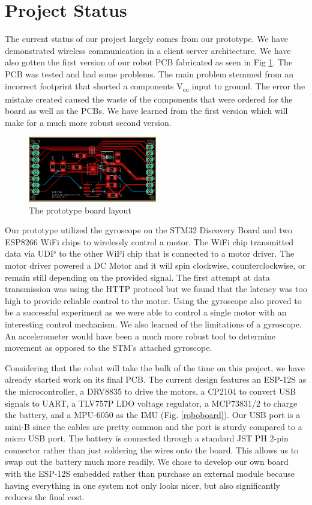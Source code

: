 \documentclass[11pt]{ieeeconf}
\begin{document}
\section{Project Status}
The current status of our project largely comes from our prototype. We have demonstrated wireless communication in a client server architecture. We have also gotten the first version of our robot PCB fabricated as seen in Fig \ref{prototype}. The PCB was tested and had some problems. The main problem stemmed from an incorrect footprint that shorted a components V\textsubscript{cc} input to ground. The error the mistake created caused the waste of the components that were ordered for the board as well as the PCBs. We have learned from the first version which will make for a much more robust second version.

\begin{figure}[H]
\centering
\captionsetup{justification=centering}
\includegraphics[width=0.5\textwidth]{images/prototype.png}
\caption{The prototype board layout}
\label{prototype}
\end{figure}

Our prototype utilized the gyroscope on the STM32 Discovery Board and two ESP8266 WiFi chips to wirelessly control a motor. The WiFi chip transmitted data via UDP to the other WiFi chip that is connected to a motor driver. The motor driver powered a DC Motor and it will spin clockwise, counterclockwise, or remain still depending on the provided signal. The first attempt at data transmission was using the HTTP protocol but we found that the latency was too high to provide reliable control to the motor. Using the gyroscope also proved to be a successful experiment as we were able to control a single motor with an interesting control mechanism. We also learned of the limitations of a gyroscope. An accelerometer would have been a much more robust tool to determine movement as opposed to the STM's attached gyroscope.  

Considering that the robot will take the bulk of the time on this project, we have already started work on its final PCB. The current design features an ESP-12S as the microcontroller, a DRV8835 to drive the motors, a CP2104 to convert USB signals to UART, a TLV757P LDO voltage regulator, a MCP73831/2 to charge the battery, and a MPU-6050 as the IMU (Fig. \ref{roboboard}). Our USB port is a mini-B since the cables are pretty common and the port is sturdy compared to a micro USB port. The battery is connected through a standard JST PH 2-pin connector rather than just soldering the wires onto the board. This allows us to swap out the battery much more readily. We chose to develop our own board with the ESP-12S embedded rather than purchase an external module because having everything in one system not only looks nicer, but also significantly reduces the final cost.
\end{document}

